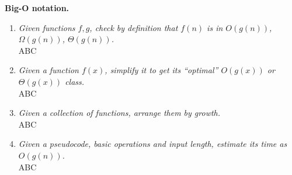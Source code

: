 \documentclass[a4paper,12pt]{article}
\begin{document}
\vspace{10pt}
{\bf Big-O notation.}


\begin{enumerate}
\item {\small \em Given functions $f,g$, check by definition that $f(n)$ is in $O(g(n))$, $\Omega(g(n))$, $\Theta(g(n))$.}\\
ABC

\item {\small \em Given a function $f(x)$, simplify it to get its ``optimal'' $O(g(x))$ or $\Theta(g(x))$ class.}\\
ABC

\item {\small \em Given a collection of functions, arrange them by growth.}\\
ABC

\item {\small \em Given a pseudocode, basic operations and input length, estimate its time as $O(g(n))$.}\\
ABC
\end{enumerate}
\end{document}
